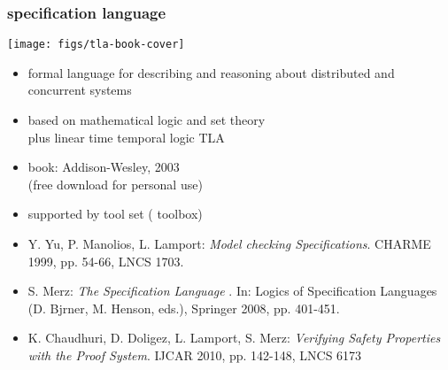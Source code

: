 \documentclass[fleqn]{beamer}
\begin{document}
\begin{frame}
  \frametitle{\tlaplus{} specification language}

  \begin{minipage}{0.27\linewidth}
    \texttt{[image: figs/tla-book-cover]}
  \end{minipage}
  \hfill
  \begin{minipage}{.7\linewidth}
    \raggedright

    \begin{small}
    \begin{itemize}
    \item formal language for describing and reasoning about
      distributed and concurrent systems
\medskip
    \item based on mathematical logic and set theory\\
      plus linear time temporal logic TLA
\medskip
    \item book: Addison-Wesley, 2003\\
      (free download for personal use)
\medskip
    \item supported by tool set (\tlaplus{} toolbox)      
    \end{itemize}
    \end{small}
  \end{minipage}

  \pause
  \bigskip


  \begin{footnotesize}
  \begin{itemize}
  \item Y. Yu, P. Manolios, L. Lamport: \emph{Model checking \tlaplus{}
      Specifications}. CHARME 1999, pp. 54-66, LNCS 1703.
  \item S. Merz: \emph{The Specification Language \tlaplus}. In: Logics of
    Specification Languages (D. Bj{\slasho}rner, M. Henson, eds.), Springer
    2008, pp. 401-451.
  \item K. Chaudhuri, D. Doligez, L. Lamport, S. Merz: \emph{Verifying Safety
    Properties with the \tlaplus{} Proof System}. IJCAR 2010, pp. 142-148, LNCS 6173
  \end{itemize}
  \end{footnotesize}
\end{frame}
\end{document}
